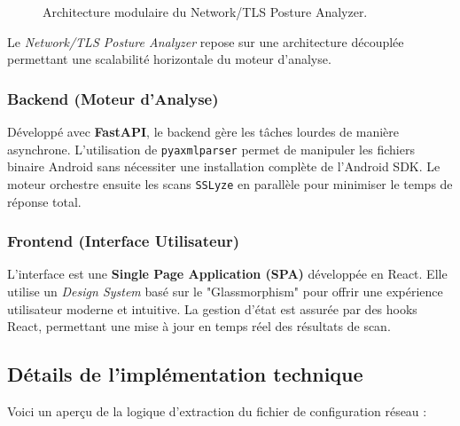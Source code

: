 \documentclass[11pt,a4paper]{article}
\begin{document}
\begin{figure}[H]
    \centering
    \caption{Architecture modulaire du Network/TLS Posture Analyzer.}
\end{figure}

Le \textit{Network/TLS Posture Analyzer} repose sur une architecture découplée permettant une scalabilité horizontale du moteur d'analyse.

\subsubsection{Backend (Moteur d'Analyse)}
Développé avec \textbf{FastAPI}, le backend gère les tâches lourdes de manière asynchrone. L'utilisation de \texttt{pyaxmlparser} permet de manipuler les fichiers binaire Android sans nécessiter une installation complète de l'Android SDK. Le moteur orchestre ensuite les scans \texttt{SSLyze} en parallèle pour minimiser le temps de réponse total.

\subsubsection{Frontend (Interface Utilisateur)}
L'interface est une \textbf{Single Page Application (SPA)} développée en React. Elle utilise un \textit{Design System} basé sur le "Glassmorphism" pour offrir une expérience utilisateur moderne et intuitive. La gestion d'état est assurée par des hooks React, permettant une mise à jour en temps réel des résultats de scan.

\subsection{Détails de l'implémentation technique}
Voici un aperçu de la logique d'extraction du fichier de configuration réseau :
\end{document}
